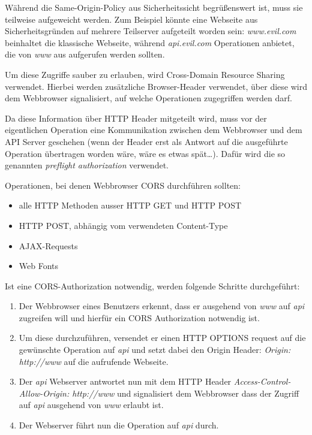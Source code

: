 Während die Same-Origin-Policy aus Sicherheitssicht begrüßenswert ist, muss sie teilweise aufgeweicht werden. Zum Beispiel könnte eine Webseite aus Sicherheitsgründen auf mehrere Teilserver aufgeteilt worden sein: \textit{www.evil.com} beinhaltet die klassische Webseite, während \textit{api.evil.com} Operationen anbietet, die von \textit{www} aus aufgerufen werden sollten.

Um diese Zugriffe sauber zu erlauben, wird Cross-Domain Resource Sharing verwendet. Hierbei werden zusätzliche Browser-Header verwendet, über diese wird dem Webbrowser signalisiert, auf welche Operationen zugegriffen werden darf.

Da diese Information über HTTP Header mitgeteilt wird, muss vor der eigentlichen Operation eine Kommunikation zwischen dem Webbrowser und dem API Server geschehen (wenn der Header erst als Antwort auf die ausgeführte Operation übertragen worden wäre, wäre es etwas spät\ldots). Dafür wird die so genannten \textit{preflight authorization} verwendet.

Operationen, bei denen Webbrowser CORS durchführen sollten:

\begin{itemize}
	\item alle HTTP Methoden ausser HTTP GET und HTTP POST
	\item HTTP POST, abhängig vom verwendeten Content-Type
	\item AJAX-Requests
	\item Web Fonts
\end{itemize}

Ist eine CORS-Authorization notwendig, werden folgende Schritte durchgeführt:

\begin{enumerate}
	\item Der Webbrowser eines Benutzers erkennt, dass er ausgehend von \textit{www} auf \textit{api} zugreifen will und hierfür ein CORS Authorization notwendig ist.
	\item Um diese durchzuführen, versendet er einen HTTP OPTIONS request auf die gewünschte Operation auf \textit{api} und setzt dabei den Origin Header: \textit{Origin: http://www} auf die aufrufende Webseite.
	\item Der \textit{api} Webserver antwortet nun mit dem HTTP Header \textit{Access-Control-Allow-Origin: http://www} und signalisiert dem Webbrowser dass der Zugriff auf \textit{api} ausgehend von \textit{www} erlaubt ist.
	\item Der Webserver führt nun die Operation auf \textit{api} durch.
\end{enumerate}


